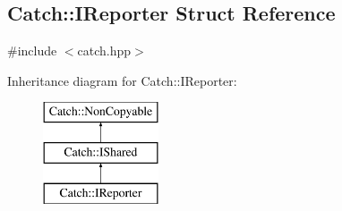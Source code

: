 \hypertarget{structCatch_1_1IReporter}{\subsection{Catch\-:\-:I\-Reporter Struct Reference}
\label{structCatch_1_1IReporter}
}


{\ttfamily \#include $<$catch.\-hpp$>$}

Inheritance diagram for Catch\-:\-:I\-Reporter\-:\begin{figure}[H]
\begin{center}
\leavevmode
\includegraphics[height=3.000000cm]{structCatch_1_1IReporter}
\end{center}
\end{figure}
